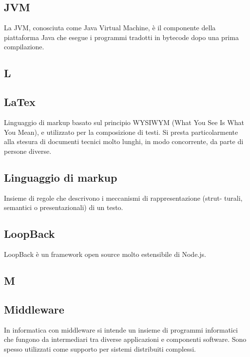 \subsection*{JVM}
La JVM, conosciuta come Java Virtual Machine, è il componente della piattaforma Java che esegue i programmi tradotti in bytecode dopo una prima compilazione.

\newpage

\begin{center}
\Huge\section*{\uppercase{L}}
\end{center}

\subsection*{LaTex}
Linguaggio di markup basato sul principio WYSIWYM (What You See Is What You
Mean), e utilizzato per la composizione di testi. Si presta particolarmente alla stesura di
documenti tecnici molto lunghi, in modo concorrente, da parte di persone diverse.

\subsection*{Linguaggio di markup}
Insieme di regole che descrivono i meccanismi di rappresentazione (strut-
turali, semantici o presentazionali) di un testo.

\subsection*{LoopBack}
LoopBack è un framework open source molto estensibile di Node.js. 

\newpage

\begin{center}
\Huge\section*{\uppercase{M}}
\end{center}

\subsection*{Middleware}
In informatica con middleware si intende un insieme di programmi informatici che fungono da intermediari tra diverse applicazioni e componenti software. Sono spesso utilizzati come supporto per sistemi distribuiti complessi.

